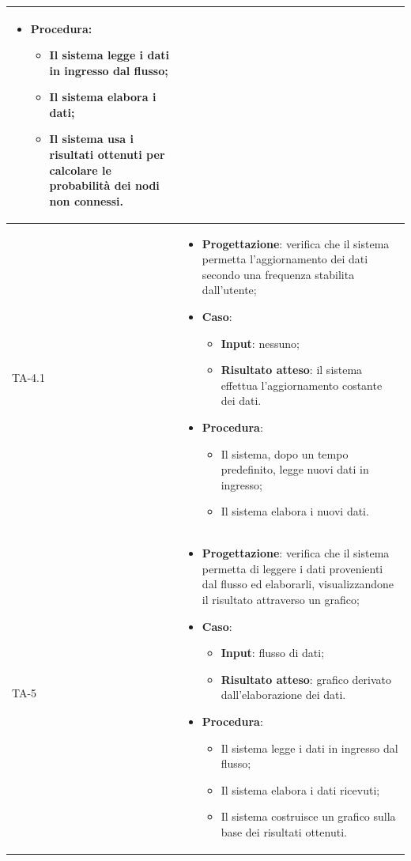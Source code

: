 \begin{longtable}{|C{2.5cm}|C{13cm}|}
\begin{itemize}
\begin{itemize}
	\end{itemize}
	\item \textbf{Procedura}:
	\begin{itemize}
		\item Il sistema legge i dati in ingresso dal flusso;
		\item Il sistema elabora i dati;
		\item Il sistema usa i risultati ottenuti per calcolare le probabilità dei nodi non connessi.
	\end{itemize} 
\end{itemize}\\
\hline
{TA-4.1} &
\begin{itemize}
	\item \textbf{Progettazione}: verifica che il sistema permetta l'aggiornamento dei dati secondo una frequenza stabilita dall'utente;
	\item \textbf{Caso}: 
	\begin{itemize}
		\item \textbf{Input}: nessuno;
		\item \textbf{Risultato atteso}: il sistema effettua l'aggiornamento costante dei dati.
	\end{itemize}
	\item \textbf{Procedura}:
	\begin{itemize}
		\item Il sistema, dopo un tempo predefinito, legge nuovi dati in ingresso;
		\item Il sistema elabora i nuovi dati.
	\end{itemize} 
\end{itemize} \\
\hline
{TA-5} &
\begin{itemize}
	\item \textbf{Progettazione}: verifica che il sistema permetta di leggere i dati provenienti dal flusso ed elaborarli, visualizzandone il risultato attraverso un grafico;
	\item \textbf{Caso}: 
	\begin{itemize}
		\item \textbf{Input}: flusso di dati;
		\item \textbf{Risultato atteso}: grafico derivato dall'elaborazione dei dati.
	\end{itemize}
	\item \textbf{Procedura}:
	\begin{itemize}
		\item Il sistema legge i dati in ingresso dal flusso;
		\item Il sistema elabora i dati ricevuti;
		\item Il sistema costruisce un grafico sulla base dei risultati ottenuti.
	\end{itemize} 
\end{itemize} \\
\hline


\end{longtable}
